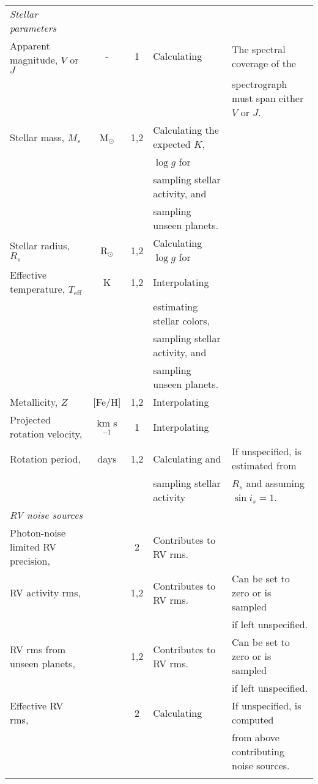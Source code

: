 \begin{landscape}
\begin{table*}
\begin{tabular}{lccll}
    \emph{Stellar parameters} & & & \\
    Apparent magnitude, $V$ or $J$ & - & 1 & Calculating \sigRV{.} & The spectral coverage of the \\ &&&& spectrograph must span either $V$ or $J$. \\
    Stellar mass, $M_s$ & M$_{\odot}$ & 1,2 & Calculating the expected $K$, & \\ &&& $\log{g}$ for \sigRV{,} & \\ &&& sampling stellar activity, and & \\ &&& sampling unseen planets. & \\
    Stellar radius, $R_s$ & R$_{\odot}$ & 1,2 & Calculating $\log{g}$ for \sigRV{.} & \\ 
    Effective temperature, $T_{\text{eff}}$ & K & 1,2 & Interpolating \sigRV{,} & \\ &&& estimating stellar colors, & \\ &&& sampling stellar activity, and & \\ &&& sampling unseen planets. & \\ 
    Metallicity, $Z$ & [Fe/H] & 1,2 & Interpolating \sigRV{.} & \\
    Projected rotation velocity, \vsini{} & km s$^{-1}$ & 1 & Interpolating \sigRV{.} & \\
    Rotation period, \prot{} & days & 1,2 & Calculating \sigRV{} and & If unspecified, \prot{} is estimated from \\ &&& sampling stellar activity & $R_s$ and \vsini{} assuming $\sin{i_s}=1$. \\
    \hline \smallskip

    \emph{RV noise sources} & & & \\
    Photon-noise limited RV precision, \sigRV{} & \mps{} & 2 & Contributes to RV rms. & \\
    RV activity rms, \sigact{} & \mps{} & 1,2 & Contributes to RV rms. & Can be set to zero or is sampled \\ &&&& if left unspecified. \\
    RV rms from unseen planets, \sigplan{} & \mps{} & 1,2 & Contributes to RV rms. & Can be set to zero or is sampled \\ &&&& if left unspecified. \\
    Effective RV rms, \sigeff{} & \mps{} & 2 & Calculating \nrv{.} & If unspecified, \sigeff{} is computed \\ &&&& from above contributing noise sources. \\
    \hline \smallskip


\end{tabular}
\end{table*}
\end{landscape}
